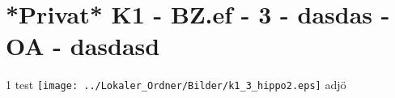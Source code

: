 \section{*Privat* K1 - BZ.ef - 3 - dasdas - OA - dasdasd}

\begin{langesbeispiel} \item[1] %
test \texttt{[image: ../Lokaler\_Ordner/Bilder/k1\_3\_hippo2.eps]} adjö
\end{langesbeispiel}